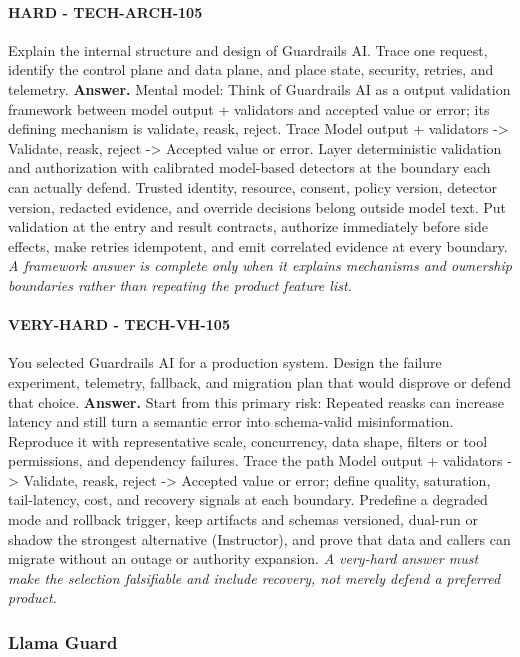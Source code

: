 \paragraph{HARD - TECH-ARCH-105} Explain the internal structure and design of Guardrails AI. Trace one request, identify the control plane and data plane, and place state, security, retries, and telemetry.
\textbf{Answer.} Mental model: Think of Guardrails AI as a output validation framework between model output + validators and accepted value or error; its defining mechanism is validate, reask, reject. Trace Model output + validators -> Validate, reask, reject -> Accepted value or error. Layer deterministic validation and authorization with calibrated model-based detectors at the boundary each can actually defend. Trusted identity, resource, consent, policy version, detector version, redacted evidence, and override decisions belong outside model text. Put validation at the entry and result contracts, authorize immediately before side effects, make retries idempotent, and emit correlated evidence at every boundary.
\textit{A framework answer is complete only when it explains mechanisms and ownership boundaries rather than repeating the product feature list.}
\paragraph{VERY-HARD - TECH-VH-105} You selected Guardrails AI for a production system. Design the failure experiment, telemetry, fallback, and migration plan that would disprove or defend that choice.
\textbf{Answer.} Start from this primary risk: Repeated reasks can increase latency and still turn a semantic error into schema-valid misinformation. Reproduce it with representative scale, concurrency, data shape, filters or tool permissions, and dependency failures. Trace the path Model output + validators -> Validate, reask, reject -> Accepted value or error; define quality, saturation, tail-latency, cost, and recovery signals at each boundary. Predefine a degraded mode and rollback trigger, keep artifacts and schemas versioned, dual-run or shadow the strongest alternative (Instructor), and prove that data and callers can migrate without an outage or authority expansion.
\textit{A very-hard answer must make the selection falsifiable and include recovery, not merely defend a preferred product.}
\subsubsection*{Llama Guard}
